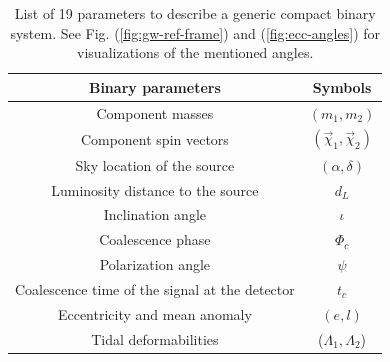 \begin{table}[h]
    \centering
    \begin{tabular}{cc}
       Binary parameters   & Symbols\\ \hline
       Component masses  & $(m_1, m_2)$\\
       Component spin vectors    & $(\vec{\chi}_1, \vec{\chi}_2)$\\
       Sky location of the source  & $(\alpha, \delta)$ \\
       Luminosity distance to the source  & $d_L$ \\
       Inclination angle  & $\iota$ \\
       Coalescence phase  & $\Phi_c$ \\
       Polarization angle  & $\psi$ \\
       Coalescence time of the signal at the detector & $t_c$ \\
       Eccentricity and mean anomaly  & $(e, l)$\\
       Tidal deformabilities & ($\Lambda_1, \Lambda_2$)\\  \hline 
    \end{tabular}
    \caption{List of 19 parameters to describe a generic compact binary system. See Fig. (\ref{fig:gw-ref-frame}) and (\ref{fig:ecc-angles}) for visualizations of the mentioned angles.}
    \label{tab:CBC-params}
\end{table}

